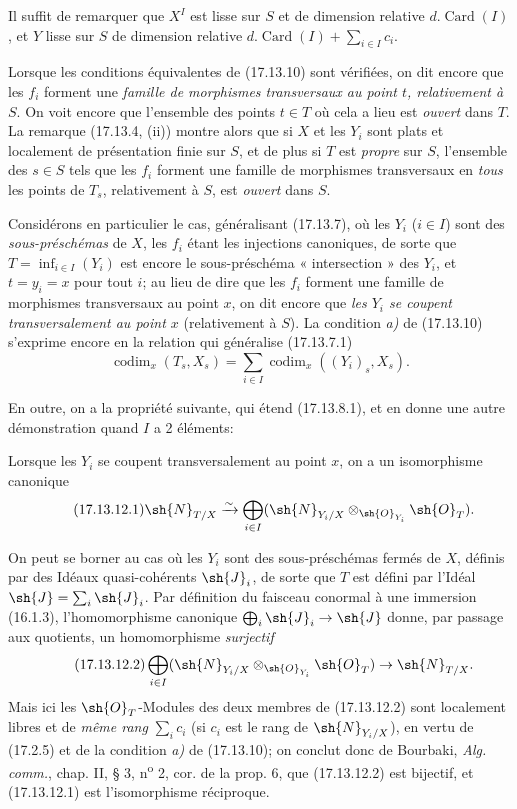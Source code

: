 Il suffit de remarquer que $X^I$ est lisse sur $S$ et de dimension relative $d.\operatorname{Card}(I)$, et $Y$ lisse sur $S$ de dimension relative $d.\operatorname{Card}(I)+\sum_{i\in I}c_i$.

Lorsque les conditions équivalentes de (17.13.10) sont vérifiées, on dit encore que les $f_i$ forment une \emph{famille de morphismes transversaux au point $t$, relativement à} $S$. On voit encore que l'ensemble des points $t\in T$ où cela a lieu est \emph{ouvert} dans $T$. La remarque (17.13.4, (ii)) montre alors que si $X$ et les $Y_i$ sont plats et localement de présentation finie sur $S$, et de plus si $T$ est \emph{propre} sur $S$, l'ensemble des $s\in S$ tels que les $f_i$ forment une famille de morphismes transversaux en \emph{tous} les points de $T_s$, relativement à $S$, est \emph{ouvert} dans $S$.

\begin{env}[17.13.11]
Considérons en particulier le cas, généralisant (17.13.7), où les $Y_i$ ($i\in I$) sont des \emph{sous-préschémas} de $X$, les $f_i$ étant les injections canoniques, de sorte que $T=\inf_{i\in I}(Y_i)$ est encore le sous-préschéma « intersection » des $Y_i$, et $t=y_i=x$ pour tout $i$; au lieu de dire que les $f_i$ forment une famille de morphismes transversaux au point $x$, on dit encore que \emph{les $Y_i$ se coupent transversalement au point $x$} (relativement à $S$). La condition \emph{a)} de (17.13.10) s'exprime encore en la relation qui généralise (17.13.7.1)
\[
\label{IV.17.13.11.1}
\tag{17.13.11.1}
\operatorname{codim}_x(T_s,X_s)=\sum_{i\in I}\operatorname{codim}_x((Y_i)_s,X_s).
\]

En outre, on a la propriété suivante, qui étend (17.13.8.1), et en donne une autre démonstration quand $I$ a 2 éléments:
\end{env}

\begin{corollary}[17.13.12]
\label{IV.17.13.12}
Lorsque les $Y_i$ se coupent transversalement au point $x$, on a un isomorphisme canonique
\[
\label{IV.17.13.12.1}
\tag{17.13.12.1}
\sh{N}_{T/X}\xrightarrow{\sim}\bigoplus_{i\in I}(\sh{N}_{Y_i/X}\otimes_{\sh{O}_{Y_i}}\sh{O}_T).
\]
\end{corollary}

On peut se borner au cas où les $Y_i$ sont des sous-préschémas fermés de $X$, définis par des Idéaux quasi-cohérents $\sh{J}_i$, de sorte que $T$ est défini par l'Idéal $\sh{J}=\sum_i\sh{J}_i$. Par définition du faisceau conormal à une immersion (16.1.3), l'homomorphisme canonique $\bigoplus_i\sh{J}_i\to\sh{J}$ donne, par passage aux quotients, un homomorphisme \emph{surjectif}
\[
\label{IV.17.13.12.2}
\tag{17.13.12.2}
\bigoplus_{i\in I}(\sh{N}_{Y_i/X}\otimes_{\sh{O}_{Y_i}}\sh{O}_T)\to\sh{N}_{T/X}.
\]
Mais ici les $\sh{O}_T$-Modules des deux membres de (17.13.12.2) sont localement libres et de \emph{même rang} $\sum_i c_i$ (si $c_i$ est le rang de $\sh{N}_{Y_i/X}$), en vertu de (17.2.5) et de la condition \emph{a)} de (17.13.10); on conclut donc de Bourbaki, \emph{Alg. comm.}, chap. II, § 3, n\textsuperscript{o} 2, cor. de la prop. 6, que (17.13.12.2) est bijectif, et (17.13.12.1) est l'isomorphisme réciproque.

